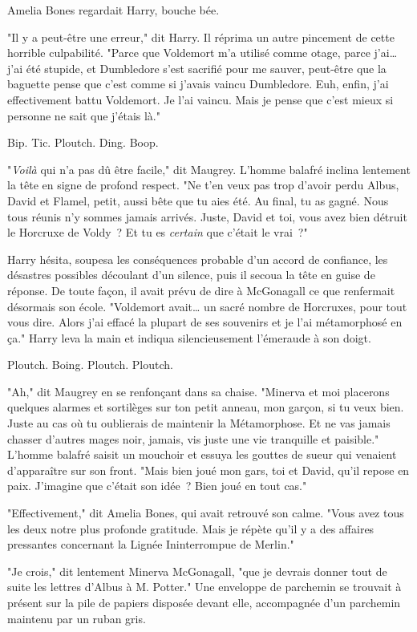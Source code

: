 Amelia Bones regardait Harry, bouche bée.

"Il y a peut-être une erreur," dit Harry. Il réprima un autre pincement de cette horrible culpabilité. "Parce que Voldemort m'a utilisé comme otage, parce j'ai… j'ai été stupide, et Dumbledore s'est sacrifié pour me sauver, peut-être que la baguette pense que c'est comme si j'avais vaincu Dumbledore. Euh, enfin, j'ai effectivement battu Voldemort. Je l'ai vaincu. Mais je pense que c'est mieux si personne ne sait que j'étais là."

Bip. Tic. Ploutch. Ding. Boop.

"\emph{Voilà} qui n'a pas dû être facile," dit Maugrey. L'homme balafré inclina lentement la tête en signe de profond respect. "Ne t'en veux pas trop d'avoir perdu Albus, David et Flamel, petit, aussi bête que tu aies été. Au final, tu as gagné. Nous tous réunis n'y sommes jamais arrivés. Juste, David et toi, vous avez bien détruit le Horcruxe de Voldy~? Et tu es \emph{certain} que c'était le vrai~?"

Harry hésita, soupesa les conséquences probable d'un accord de confiance, les désastres possibles découlant d'un silence, puis il secoua la tête en guise de réponse. De toute façon, il avait prévu de dire à McGonagall ce que renfermait désormais son école. "Voldemort avait… un sacré nombre de Horcruxes, pour tout vous dire. Alors j'ai effacé la plupart de ses souvenirs et je l'ai métamorphosé en ça." Harry leva la main et indiqua silencieusement l'émeraude à son doigt.

Ploutch. Boing. Ploutch. Ploutch.

"Ah," dit Maugrey en se renfonçant dans sa chaise. "Minerva et moi placerons quelques alarmes et sortilèges sur ton petit anneau, mon garçon, si tu veux bien. Juste au cas où tu oublierais de maintenir la Métamorphose. Et ne vas jamais chasser d'autres mages noir, jamais, vis juste une vie tranquille et paisible." L'homme balafré saisit un mouchoir et essuya les gouttes de sueur qui venaient d'apparaître sur son front. "Mais bien joué mon gars, toi et David, qu'il repose en paix. J'imagine que c'était son idée~? Bien joué en tout cas."

"Effectivement," dit Amelia Bones, qui avait retrouvé son calme. "Vous avez tous les deux notre plus profonde gratitude. Mais je répète qu'il y a des affaires pressantes concernant la Lignée Ininterrompue de Merlin."

"Je crois," dit lentement Minerva McGonagall, "que je devrais donner tout de suite les lettres d'Albus à M. Potter." Une enveloppe de parchemin se trouvait à présent sur la pile de papiers disposée devant elle, accompagnée d'un parchemin maintenu par un ruban gris.

